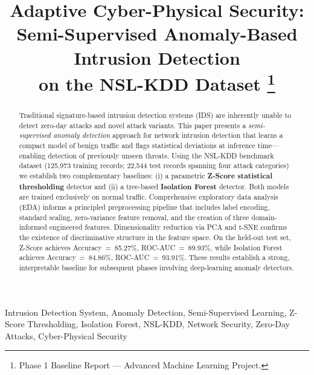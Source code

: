 \documentclass[conference]{IEEEtran}
\begin{document}
\title{%
  Adaptive Cyber-Physical Security:\\
  Semi-Supervised Anomaly-Based Intrusion Detection\\
  on the NSL-KDD Dataset
  \thanks{Phase 1 Baseline Report --- Advanced Machine Learning Project.}
}

\author{%
}

\maketitle

\begin{abstract}
Traditional signature-based intrusion detection systems (IDS) are inherently unable
to detect zero-day attacks and novel attack variants.  This paper presents a
\emph{semi-supervised anomaly detection} approach for network intrusion detection
that learns a compact model of benign traffic and flags statistical deviations at
inference time---enabling detection of previously unseen threats.  Using the
NSL-KDD benchmark dataset (125,973 training records; 22,544 test records spanning
four attack categories) we establish two complementary baselines: (i) a parametric
\textbf{Z-Score statistical thresholding} detector and (ii) a tree-based
\textbf{Isolation Forest} detector.  Both models are trained exclusively on normal
traffic.  Comprehensive exploratory data analysis (EDA) informs a principled
preprocessing pipeline that includes label encoding, standard scaling, zero-variance
feature removal, and the creation of three domain-informed engineered features.
Dimensionality reduction via PCA and t-SNE confirms the existence of discriminative
structure in the feature space.  On the held-out test set, Z-Score achieves
Accuracy~=~85.27\%, ROC-AUC~=~89.93\%, while Isolation Forest achieves
Accuracy~=~84.86\%, ROC-AUC~=~93.91\%.  These results establish a strong, interpretable
baseline for subsequent phases involving deep-learning anomaly detectors.
\end{abstract}

\begin{IEEEkeywords}
Intrusion Detection System, Anomaly Detection, Semi-Supervised Learning,
Z-Score Thresholding, Isolation Forest, NSL-KDD, Network Security,
Zero-Day Attacks, Cyber-Physical Security
\end{IEEEkeywords}
\end{document}
